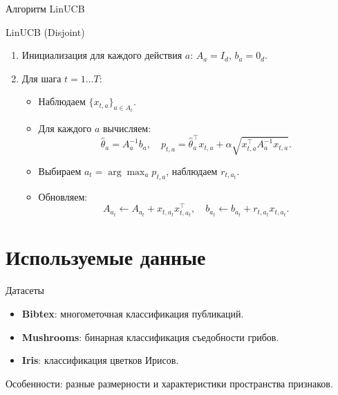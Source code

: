 \documentclass[10pt]{beamer}
\begin{document}
\begin{frame}[fragile]{Алгоритм LinUCB}
  \begin{block}{LinUCB (Disjoint)}
  \begin{enumerate}
    \item Инициализация для каждого действия $a$: $A_a=I_d$, $b_a=0_d$.
    \item Для шага $t=1\dots T$:
      \begin{itemize}
        \item Наблюдаем $\{x_{t,a}\}_{a\in A_t}$.
        \item Для каждого $a$ вычисляем:
        \[
          \hat{\theta}_a=A_a^{-1}b_a,\quad p_{t,a}=\hat{\theta}_a^\top x_{t,a}+\alpha\sqrt{x_{t,a}^\top A_a^{-1}x_{t,a}}.
        \]
        \item Выбираем $a_t=\arg\max_a p_{t,a}$, наблюдаем $r_{t,a_t}$.
        \item Обновляем:
        \[
          A_{a_t} \leftarrow A_{a_t} + x_{t,a_t}x_{t,a_t}^\top,
          \quad b_{a_t} \leftarrow b_{a_t} + r_{t,a_t} x_{t,a_t}.
        \]
      \end{itemize}
  \end{enumerate}
  \end{block}
\end{frame}

\section{Используемые данные}
\begin{frame}{Датасеты}
  \begin{itemize}
    \item \textbf{Bibtex}: многометочная классификация публикаций.
    \item \textbf{Mushrooms}: бинарная классификация съедобности грибов.
    \item \textbf{Iris}: классификация цветков Ирисов.
  \end{itemize}
  Особенности: разные размерности и характеристики пространства признаков.
\end{frame}
\end{document}
